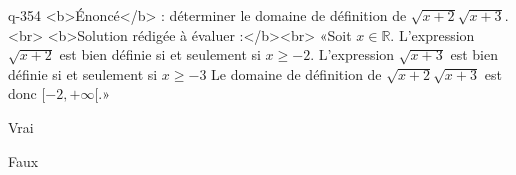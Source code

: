 \begin{truefalse}{q-354}
<b>Énoncé</b> : déterminer le domaine de définition de $\sqrt{x+2}\sqrt{x+3}$.<br> <b>Solution rédigée à évaluer :</b><br>  «Soit $x\in\mathbb{R}$.  L'expression $\sqrt{x+2}$ est bien définie si et seulement si $x\geq -2$. L'expression $\sqrt{x+3}$ est bien définie si et seulement si $x\geq -3$ Le domaine de définition de $\sqrt{x+2}\sqrt{x+3}$ est donc $[-2,+\infty[$.»
\item* Vrai
\item Faux
\end{truefalse}

